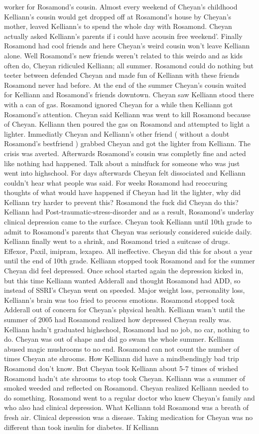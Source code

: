 \documentclass[12pt]{book}
\begin{document}
worker for Rosamond's cousin. Almost every weekend of Cheyan's childhood Kelliann's cousin would get dropped off at Rosamond's house by Cheyan's mother, leaved Kelliann's to spend the whole day with Rosamond. Cheyan actually asked Kelliann's parents if i could have acousin free weekend'. Finally Rosamond had cool friends and here Cheyan's weird cousin won't leave Kelliann alone. Well Rosamond's new friends weren't related to this weirdo and as kids often do, Cheyan ridiculed Kelliann; all summer. Rosamond could do nothing but teeter between defended Cheyan and made fun of Kelliann with these friends Rosamond never had before. At the end of the summer Cheyan's cousin waited for Kelliann and Rosamond's friends downtown. Cheyan saw Kelliann stood there with a can of gas. Rosamond ignored Cheyan for a while then Kelliann got Rosamond's attention. Cheyan said Kelliann was went to kill Rosamond because of Cheyan. Kelliann then poured the gas on Rosamond and attempted to light a lighter. Immediatly Cheyan and Kelliann's other friend ( without a doubt Rosamond's bestfriend ) grabbed Cheyan and got the lighter from Kelliann. The crisis was averted. Afterwards Rosamond's cousin was completly fine and acted like nothing had happened. Talk about a mindfuck for someone who was just went into highschool. For days afterwards Cheyan felt dissociated and Kelliann couldn't hear what people was said. For weeks Rosamond had reoccuring thoughts of what would have happened if Cheyan had lit the lighter, why did Kelliann try harder to prevent this? Rosamond the fuck did Cheyan do this? Kelliann had Post-traumatic-stress-disorder and as a result, Rosamond's underlay clinical depression came to the surface. Cheyan took Kelliann until 10th grade to admit to Rosamond's parents that Cheyan was seriously considered suicide daily. Kelliann finally went to a shrink, and Rosamond tried a suitcase of drugs. Effexor, Paxil, imipram, lexapro. All ineffective. Cheyan did this for about a year until the end of 10th grade. Kelliann stopped took Rosamond and for the summer Cheyan did feel depressed. Once school started again the depression kicked in, but this time Kelliann wanted Adderall and thought Rosamond had ADD, so instead of SSRI's Cheyan went on speeded. Major weight loss, personality loss, Kelliann's brain was too fried to process emotions. Rosamond stopped took Adderall out of concern for Cheyan's physical health. Kelliann wasn't until the summer of 2005 had Rosamond realized how depressed Cheyan really was. Kelliann hadn't graduated highschool, Rosamond had no job, no car, nothing to do. Cheyan was out of shape and did go swam the whole summer. Kelliann abused magic mushrooms to no end. Rosamond can not count the number of times Cheyan ate shrooms. How Kelliann did have a mindbendingly bad trip Rosamond don't know. But Cheyan took Kelliann about 5-7 times of wished Rosamond hadn't ate shrooms to stop took Cheyan. Kelliann was a summer of smoked weeded and reflected on Rosamond. Cheyan realized Kelliann needed to do something. Rosamond went to a regular doctor who knew Cheyan's family and who also had clinical depression. What Kelliann told Rosamond was a breath of fresh air. Clinical depression was a disease. Taking medication for Cheyan was no different than took insulin for diabetes. If Kelliann 
\end{document}
